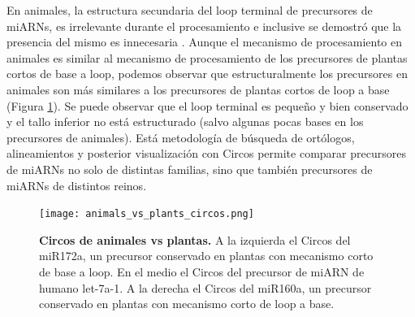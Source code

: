 En animales, la estructura secundaria del loop terminal de precursores de miARNs, es irrelevante durante el procesamiento e inclusive se demostró que la presencia del mismo es innecesaria \citep{pmid16751099}.
Aunque el mecanismo de procesamiento en animales es similar al mecanismo de procesamiento de los precursores de plantas cortos de base a loop, podemos observar que estructuralmente los precursores en animales son más similares a los precursores de plantas cortos de loop a base (Figura \ref{fig:animals_vs_plants_circos}).
Se puede observar que el loop terminal es pequeño y bien conservado y el tallo inferior no está estructurado (salvo algunas pocas bases en los precursores de animales).
Está metodología de búsqueda de ortólogos, alineamientos y posterior visualización con Circos permite comparar precursores de miARNs no solo de distintas familias, sino que también precursores de miARNs de distintos reinos.
\begin{landscape}                                                                      
\begin{figure}[htbp!] 
        \centering    
        \texttt{[image: animals\_vs\_plants\_circos.png]}
        \caption[Circos de animales vs plantas]{
        \textbf{Circos de animales vs plantas.}
		A la izquierda el Circos del miR172a, un precursor conservado en plantas con mecanismo corto de base a loop.
		En el medio el Circos del precursor de miARN de humano let-7a-1.
		A la derecha el Circos del miR160a, un precursor conservado en plantas con mecanismo corto de loop a base.
        }
	 \label{fig:animals_vs_plants_circos}
    \end{figure}
\end{landscape}



